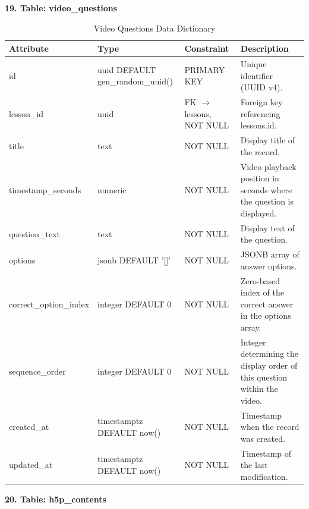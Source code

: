 \documentclass[12pt, oneside]{article} %
\newcommand{\tabbreak}{\hyphenpenalty=200\exhyphenpenalty=200\tolerance=4000\hbadness=10000\hspace{0pt}}
\begin{document}
\textbf{19. Table: video\_questions}

\begin{table}[H]
\caption{Video Questions Data Dictionary}
\label{tab:dd_video_questions}
\vspace{-4mm}
\begin{center}
\renewcommand{\arraystretch}{1.15}
\scriptsize
\begin{tabular}{|>{\raggedright\arraybackslash\tabbreak}p{2.67cm}|>{\raggedright\arraybackslash\tabbreak}p{2.93cm}|>{\raggedright\arraybackslash\tabbreak}p{2.67cm}|>{\raggedright\arraybackslash\tabbreak}p{4.51cm}|}
\hline
\textbf{Attribute} & \textbf{Type} & \textbf{Constraint} & \textbf{Description} \\ \hline
id & uuid DEFAULT gen\_random\_uuid() & PRIMARY KEY & Unique identifier (UUID v4). \\ \hline
lesson\_id & uuid & FK $\rightarrow$ lessons, NOT NULL & Foreign key referencing lessons.id. \\ \hline
title & text & NOT NULL & Display title of the record. \\ \hline
timestamp\_seconds & numeric & NOT NULL & Video playback position in seconds where the question is displayed. \\ \hline
question\_text & text & NOT NULL & Display text of the question. \\ \hline
options & jsonb DEFAULT '[]' & NOT NULL & JSONB array of answer options. \\ \hline
correct\_option\_index & integer DEFAULT 0 & NOT NULL & Zero-based index of the correct answer in the options array. \\ \hline
sequence\_order & integer DEFAULT 0 & NOT NULL & Integer determining the display order of this question within the video. \\ \hline
created\_at & timestamptz DEFAULT now() & NOT NULL & Timestamp when the record was created. \\ \hline
updated\_at & timestamptz DEFAULT now() & NOT NULL & Timestamp of the last modification. \\ \hline
\end{tabular}
\end{center}
\end{table}

\textbf{20. Table: h5p\_contents}
\end{document}
